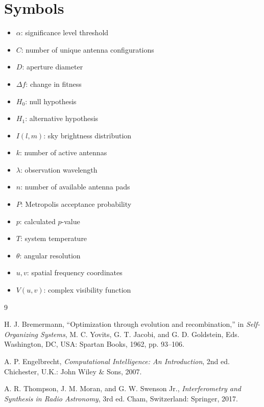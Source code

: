 \documentclass[conference]{IEEEtran}
\begin{document}
\section{Symbols}
\begin{itemize}
    \item $\alpha$: significance level threshold
    \item $C$: number of unique antenna configurations
    \item $D$: aperture diameter
    \item $\Delta f$: change in fitness
    \item $H_0$: null hypothesis
    \item $H_1$: alternative hypothesis
    \item $I(l,m)$: sky brightness distribution
    \item $k$: number of active antennas
    \item $\lambda$: observation wavelength
    \item $n$: number of available antenna pads
    \item $P$: Metropolis acceptance probability
    \item $p$: calculated $p$-value
    \item $T$: system temperature
    \item $\theta$: angular resolution
    \item $u, v$: spatial frequency coordinates
    \item $V(u,v)$: complex visibility function
\end{itemize}


\begin{thebibliography}{9}

H. J. Bremermann, ``Optimization through evolution and recombination,'' in \emph{Self-Organizing Systems}, M. C. Yovits, G. T. Jacobi, and G. D. Goldstein, Eds. Washington, DC, USA: Spartan Books, 1962, pp. 93--106.

A. P. Engelbrecht, \emph{Computational Intelligence: An Introduction}, 2nd ed. Chichester, U.K.: John Wiley \& Sons, 2007.

A. R. Thompson, J. M. Moran, and G. W. Swenson Jr., \emph{Interferometry and Synthesis in Radio Astronomy}, 3rd ed. Cham, Switzerland: Springer, 2017.


\end{thebibliography}
\end{document}

